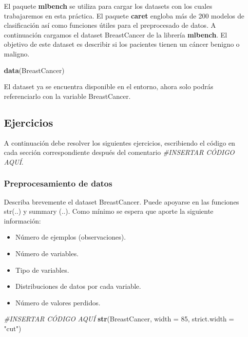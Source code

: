 \documentclass[
]{article}
\newenvironment{Shaded}{\begin{snugshade}}{\end{snugshade}}
\newcommand{\CommentTok}[1]{\textcolor[rgb]{0.56,0.35,0.01}{\textit{#1}}}
\newcommand{\DataTypeTok}[1]{\textcolor[rgb]{0.13,0.29,0.53}{#1}}
\newcommand{\DecValTok}[1]{\textcolor[rgb]{0.00,0.00,0.81}{#1}}
\newcommand{\KeywordTok}[1]{\textcolor[rgb]{0.13,0.29,0.53}{\textbf{#1}}}
\newcommand{\NormalTok}[1]{#1}
\newcommand{\StringTok}[1]{\textcolor[rgb]{0.31,0.60,0.02}{#1}}
\providecommand{\tightlist}{%
  \setlength{\itemsep}{0pt}\setlength{\parskip}{0pt}}
\begin{document}
El paquete \textbf{mlbench} se utiliza para cargar los datasets con los
cuales trabajaremos en esta práctica. El paquete \textbf{caret} engloba
más de 200 modelos de clasificación así como funciones útiles para el
preprocesado de datos. A continuación cargamos el dataset BreastCancer
de la librería \textbf{mlbench}. El objetivo de este dataset es
describir si los pacientes tienen un cáncer benigno o maligno.

\begin{Shaded}
\begin{Highlighting}[]
\KeywordTok{data}\NormalTok{(BreastCancer)}
\end{Highlighting}
\end{Shaded}

El dataset ya se encuentra disponible en el entorno, ahora solo podrás
referenciarlo con la variable BreastCancer.

\hypertarget{ejercicios}{%
\subsection{Ejercicios}\label{ejercicios}}

A continuación debe resolver los siguientes ejercicios, escribiendo el
código en cada sección correspondiente después del comentario
\emph{\#INSERTAR CÓDIGO AQUÍ}.

\hypertarget{preprocesamiento-de-datos}{%
\subsubsection{Preprocesamiento de
datos}\label{preprocesamiento-de-datos}}

Describa brevemente el dataset BreastCancer. Puede apoyarse en las
funciones str(..) y summary (..). Como mínimo se espera que aporte la
siguiente información:

\begin{itemize}
\tightlist
\item
  Número de ejemplos (observaciones).
\item
  Número de variables.
\item
  Tipo de variables.
\item
  Distribuciones de datos por cada variable.
\item
  Número de valores perdidos.
\end{itemize}

\begin{Shaded}
\begin{Highlighting}[]
\CommentTok{#INSERTAR CÓDIGO AQUÍ}
\KeywordTok{str}\NormalTok{(BreastCancer, }\DataTypeTok{width =} \DecValTok{85}\NormalTok{, }\DataTypeTok{strict.width =} \StringTok{"cut"}\NormalTok{)}
\end{Highlighting}
\end{Shaded}
\end{document}
